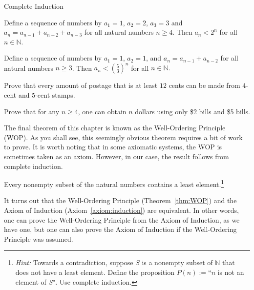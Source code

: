\begin{section}{Complete Induction}
\begin{theorem}
Define a sequence of numbers by $a_1=1$, $a_2=2$, $a_3=3$ and $a_n=a_{n-1}+a_{n-2}+a_{n-3}$ for all natural numbers $n\geq 4$.  Then $a_n<2^n$ for all $n\in\mathbb N$.
\end{theorem}

\begin{theorem}
Define a sequence of numbers by $a_1=1$, $a_2=1$, and $a_n=a_{n-1}+a_{n-2}$ for all natural numbers $n \geq 3$.  Then $a_n < \left ( \frac{5}{3} \right )^n$ for all $n \in \mathbb{N}.$
\end{theorem}

\begin{problem}
Prove that every amount of postage that is at least $12$ cents can be made from $4$-cent and $5$-cent stamps.
\end{problem}

\begin{problem}
Prove that for any $n \geq 4$, one can obtain $n$ dollars using only \$2 bills and \$5 bills.
\end{problem}

The final theorem of this chapter is known as the Well-Ordering Principle (WOP). As you shall see, this seemingly obvious theorem requires a bit of work to prove. It is worth noting that in some axiomatic systems, the WOP is sometimes taken as an axiom.  However, in our case, the result follows from complete induction.

\begin{theorem}\label{thm:WOP}
Every nonempty subset of the natural numbers contains a least element.\footnote{\emph{Hint:} Towards a contradiction, suppose $S$ is a nonempty subset of $\mathbb{N}$ that does not have a least element.  Define the proposition $P(n):=$``$n$ is not an element of $S$". Use complete induction.}
\end{theorem}

It turns out that the Well-Ordering Principle (Theorem~\ref{thm:WOP}) and the Axiom of Induction (Axiom~\ref{axiom:induction}) are equivalent.  In other words, one can prove the Well-Ordering Principle from the Axiom of Induction, as we have one, but one can also prove the Axiom of Induction if the Well-Ordering Principle was assumed.

\end{section}